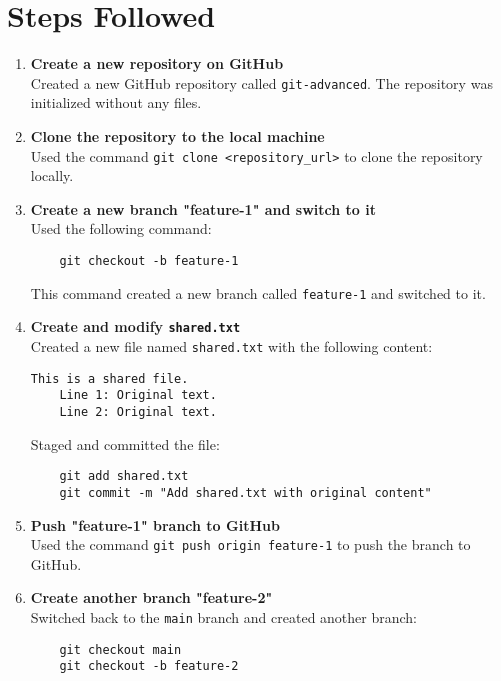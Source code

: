 \documentclass{article}
\begin{document}
\section*{Steps Followed}
\begin{enumerate}
    \item \textbf{Create a new repository on GitHub}\\
    Created a new GitHub repository called \texttt{git-advanced}. The repository was initialized without any files.
    
    \item \textbf{Clone the repository to the local machine}\\
    Used the command \texttt{git clone <repository\_url>} to clone the repository locally.
    
    \item \textbf{Create a new branch "feature-1" and switch to it}\\
    Used the following command:
    \begin{lstlisting}
    git checkout -b feature-1
    \end{lstlisting}
    This command created a new branch called \texttt{feature-1} and switched to it.

    \item \textbf{Create and modify \texttt{shared.txt}}\\
    Created a new file named \texttt{shared.txt} with the following content:
    \begin{lstlisting}[language={}]
    This is a shared file.
    Line 1: Original text.
    Line 2: Original text.
    \end{lstlisting}
    Staged and committed the file:
    \begin{lstlisting}
    git add shared.txt
    git commit -m "Add shared.txt with original content"
    \end{lstlisting}

    \item \textbf{Push "feature-1" branch to GitHub}\\
    Used the command \texttt{git push origin feature-1} to push the branch to GitHub.

    \item \textbf{Create another branch "feature-2"}\\
    Switched back to the \texttt{main} branch and created another branch:
    \begin{lstlisting}
    git checkout main
    git checkout -b feature-2
    \end{lstlisting}


\end{enumerate}
\end{document}
